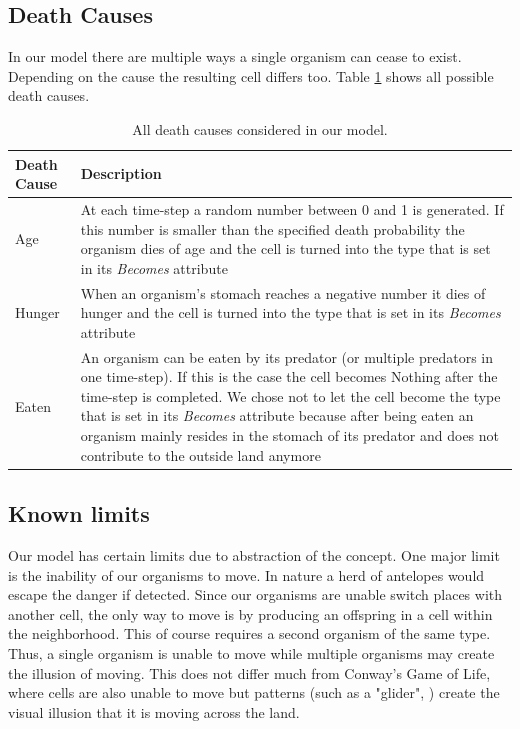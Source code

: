 \documentclass[11pt]{article}
\begin{document}
\subsection{Death Causes}
\label{sec:DeathCauses}
In our model there are multiple ways a single organism can cease to exist. Depending on the cause the resulting cell differs too. Table \ref{tab:deathCauses} shows all possible death causes.
\begin{table}[htbp]
\centering
\begin{tabular}{l|p{11cm}}
Death Cause & Description \\ 
\hline 
\hline 
Age & At each time-step a random number between 0 and 1 is generated. If this number is smaller than the specified death probability the organism dies of age and the cell is turned into the type that is set in its {\it Becomes} attribute\\ 
\hline 
Hunger & When an organism's stomach reaches a negative number it dies of hunger and the cell is turned into the type that is set in its {\it Becomes} attribute\\ 
\hline 
Eaten & An organism can be eaten by its predator (or multiple predators in one time-step). If this is the case the cell becomes Nothing after the time-step is completed. We chose not to let the cell become the type that is set in its {\it Becomes} attribute because after being eaten an organism mainly resides in the stomach of its predator and does not contribute to the outside land anymore\\  
\end{tabular}
\caption{All death causes considered in our model.}
\label{tab:deathCauses}
\end{table}

\subsection{Known limits}
\label{sec:knownLimits}
Our model has certain limits due to abstraction of the concept. One major limit is the inability of our organisms to move. In nature a herd of antelopes would escape the danger if detected. Since our organisms are unable switch places with another cell, the only way to move is by producing an offspring in a cell within the neighborhood. This of course requires a second organism of the same type. Thus, a single organism is unable to move while multiple organisms may create the illusion of moving. This does not differ much from Conway's Game of Life, where cells are also unable to move but patterns (such as a "glider", \cite{gameOfLife}) create the visual illusion that it is moving across the land.
\end{document}
